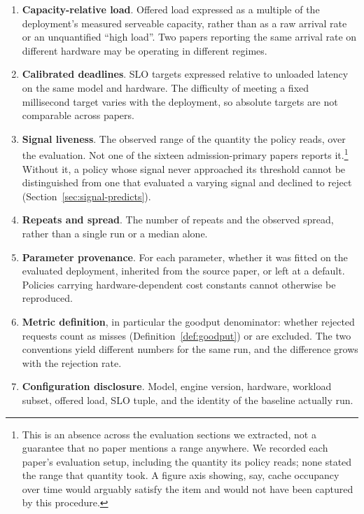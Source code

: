 \begin{enumerate}[leftmargin=1.5em, itemsep=2pt]
\item \textbf{Capacity-relative load}. Offered load expressed as a
      multiple of the deployment's measured serveable capacity, rather
      than as a raw arrival rate or an unquantified ``high load''. Two
      papers reporting the same arrival rate on different hardware may
      be operating in different regimes.
\item \textbf{Calibrated deadlines}. SLO targets expressed relative to
      unloaded latency on the same model and hardware. The difficulty
      of meeting a fixed millisecond target varies with the deployment,
      so absolute targets are not comparable across papers.
\item \textbf{Signal liveness}. The observed range of the quantity the
      policy reads, over the evaluation. Not one of the sixteen
      admission-primary papers reports it.\footnote{This is an absence
      across the evaluation sections we extracted, not a guarantee that
      no paper mentions a range anywhere. We recorded each paper's
      evaluation setup, including the quantity its policy reads; none
      stated the range that quantity took. A figure axis showing, say,
      cache occupancy over time would arguably satisfy the item and
      would not have been captured by this procedure.} Without it, a policy whose signal never approached its
      threshold cannot be distinguished from one that evaluated a
      varying signal and declined to reject
      (Section~\ref{sec:signal-predicts}).
\item \textbf{Repeats and spread}. The number of repeats and the
      observed spread, rather than a single run or a median alone.
\item \textbf{Parameter provenance}. For each parameter, whether it was
      fitted on the evaluated deployment, inherited from the source
      paper, or left at a default. Policies carrying hardware-dependent
      cost constants cannot otherwise be reproduced.
\item \textbf{Metric definition}, in particular the goodput
      denominator: whether rejected requests count as misses
      (Definition~\ref{def:goodput}) or are excluded. The two
      conventions yield different numbers for the same run, and the
      difference grows with the rejection rate.
\item \textbf{Configuration disclosure}. Model, engine version,
      hardware, workload subset, offered load, SLO tuple, and the
      identity of the baseline actually run.
\end{enumerate}

